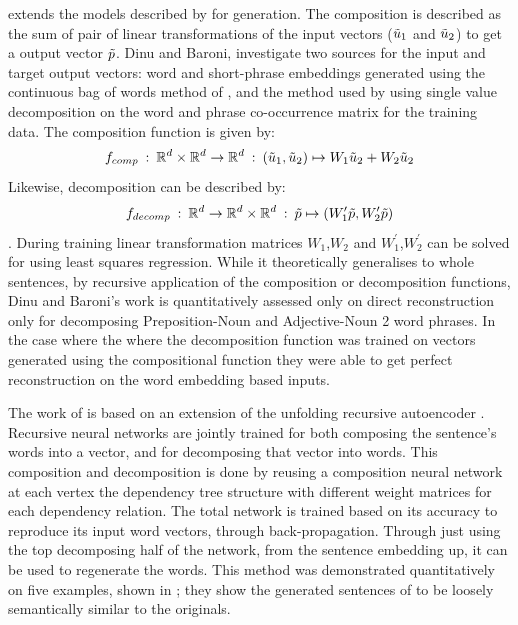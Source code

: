 \documentclass[11pt]{article}
\theoremstyle{plain}
\theoremstyle{definition}
\begin{document}
\textcite{Dinu2014CompositionalGeneration}  extends the models described by \textcite{zanzotto2010estimating, Guevara2010} for generation. The composition is described as the sum of pair of linear transformations of the input vectors ($\tilde{u}_1$ and $\tilde{u}_2$) to get a output vector $\p$. Dinu and Baroni, investigate two sources for the input and target output vectors: word and short-phrase embeddings generated using the continuous bag of words method of \cite{mikolov2013efficient}, and the method used by \textcite{Guevara2010} using single value decomposition on the word and phrase co-occurrence matrix for the training data. The composition function is given by:  $$f_{comp}\::\:\mathbb{R}^d\times\mathbb{R}^d \to \mathbb{R}^d\::\: (\tilde{u}_1, \tilde{u}_2)\mapsto W_1\tilde{u}_2+W_2\tilde{u}_2$$
Likewise, decomposition can be described by: $$f_{decomp}\::\:\mathbb{R}^d\to \mathbb{R}^d\times\mathbb{R}^d \::\: \p \mapsto (W^\prime_1\p, W^\prime_2\p)$$.
During training linear transformation matrices $W_1$,$W_2$ and $W_1^\prime$,$W_2^\prime$ can be solved for using least squares regression.
While it theoretically generalises to whole sentences, by recursive application of the composition or decomposition functions, Dinu and Baroni's work is quantitatively assessed only on direct reconstruction only for decomposing Preposition-Noun and Adjective-Noun 2 word phrases. In the case where the  where the decomposition function was trained on vectors generated using the compositional function they were able to get perfect reconstruction on the word embedding based inputs.

\renewcommand{\p}{\tilde{p}}

The work of \textcite{iyyer2014generating} is based on an extension of the unfolding recursive autoencoder \textcite{SocherEtAl2011:PoolRAE}. Recursive neural networks are jointly trained for both composing the sentence's words into a vector, and for decomposing that vector into words. This composition and decomposition is done by reusing a composition neural network at each vertex the  dependency tree structure with different weight matrices for each dependency relation. The total network is trained based on its accuracy to reproduce its input word vectors, through back-propagation. Through just using the top decomposing half of the network, from the sentence embedding up, it can be used to regenerate the words. This method was demonstrated quantitatively on five examples, shown in ; they show the generated sentences of \textcite{iyyer2014generating} to be loosely semantically similar to the originals.
\end{document}

